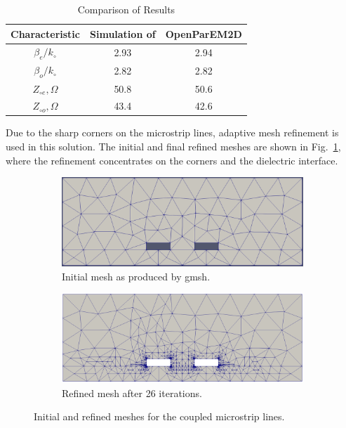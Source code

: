 \documentclass[titlepage]{article}
\renewcommand\_{\textunderscore\linebreak[1]}
\begin{document}
\begin{table}[ht]
\caption{Comparison of Results}
\begin{center}
\begin{tabular}{|c|c|c|}
\hline
Characteristic & Simulation of \cite{Olyslager} & OpenParEM2D \\
\hline
$\beta_e/k_\circ$ & 2.93 & 2.94 \\
$\beta_o/k_\circ$ & 2.82 & 2.82 \\
$Z_{\circ e},\Omega$ & 50.8 & 50.6 \\
$Z_{\circ o},\Omega$ & 43.4 & 42.6 \\
\hline
\end{tabular}
\end{center}
\label{table:coupled_results}
\end{table}

Due to the sharp corners on the microstrip lines, adaptive mesh refinement is used in this solution.  The initial and final refined meshes are shown in Fig.~\ref{fig:coupled_mesh}, where the refinement concentrates on the corners and the dielectric interface.

\begin{figure}[H]
  \centering
  \begin{subfigure}{0.45\textwidth}
     \includegraphics[width=\linewidth]{../tutorials/OpenParEM2D/coupled_microstrip/screenshots/coupled_initial_mesh}
     \caption{Initial mesh as produced by gmsh.}
  \end{subfigure}
  \begin{subfigure}{0.45\textwidth}
     \includegraphics[width=\linewidth]{../tutorials/OpenParEM2D/coupled_microstrip/screenshots/coupled_refined_mesh}
     \caption{Refined mesh after 26 iterations.}
  \end{subfigure}
  \caption{Initial and refined meshes for the coupled microstrip lines.}
  \label{fig:coupled_mesh}
\end{figure}
\end{document}
